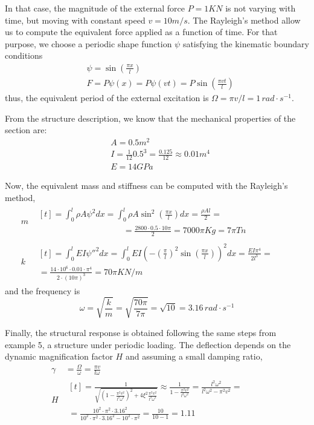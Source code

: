 \begin{Answer}[ref={moving_load}]
In that case, the magnitude of the external force $P=1KN$ is not varying with time, but moving with constant speed $v=10m/s$. The Rayleigh's method allow us to compute the equivalent force applied as a function of time. For that purpose, we choose a periodic shape function $\psi$ satisfying the kinematic boundary conditions
\begin{align*}
&\psi = \sin\left(\frac{\pi x}{l}\right) \\
&F = P\psi(x) = P\psi(vt) = P\sin\left(\frac{\pi vt}{l}\right)
\end{align*}
thus, the equivalent period of the external excitation is $\Omega = \pi v/l = 1\,rad\cdot s^{-1}$.

From the structure description, we know that the mechanical properties of the section are:
\begin{align*}
&A = 0.5m^2 \\
&I = \frac{1}{12}0.5^3 = \frac{0.125}{12} \approx 0.01 m^4\\
&E = 14GPa
\end{align*}

Now, the equivalent mass and stiffness can be computed with the Rayleigh's method,
\begin{align*}
m& \begin{multlined}[t]= \int_0^l \rho A\psi^2dx = \int_0^l \rho A\sin^2\left(\frac{\pi x}{l}\right)dx = \frac{\rho Al}{2} = \\
\phantom{\hspace{10em}}= \frac{2800 \cdot 0.5 \cdot 10\pi}{2} = 7000\pi Kg = 7\pi Tn\end{multlined} \\
k& \begin{multlined}[t]= \int_0^l EI\psi''^2dx = \int_0^l EI\left(-\left(\frac{\pi}{l}\right)^2\sin\left(\frac{\pi x}{l}\right)\right)^2dx = \frac{EI\pi^4}{2l^3} = \qquad \\
= \frac{14\cdot 10^6 \cdot 0.01 \cdot \pi^4}{2 \cdot (10\pi)^3} =
70\pi KN/m \end{multlined}
\end{align*}
and the frequency is
$$
\omega = \sqrt{\frac{k}{m}} = \sqrt{\frac{70\pi}{7\pi}} = \sqrt{10} = 3.16\,rad\cdot s^{-1}
$$

Finally, the structural response is obtained following the same steps from example 5, a structure under periodic loading. The deflection depends on the dynamic magnification factor $H$ and assuming a small damping ratio,
\begin{align*}
\gamma& = \frac{\Omega}{\omega} = \frac{\pi v}{l\omega} \\
H& \begin{multlined}[t]= \frac{1}{\sqrt{\left(1-\frac{\pi^2v^2}{l^2\omega^2}\right)^2 + 4\xi^2\frac{\pi^2v^2}{l^2\omega^2}}} \approx \frac{1}{1-\frac{\pi^2v^2}{l^2\omega^2}} = \frac{l^2\omega^2}{l^2\omega^2-\pi^2v^2} = \qquad \\
= \frac{10^2\cdot\pi^2\cdot 3.16^2}{10^2\cdot\pi^2\cdot 3.16^2 - 10^2\cdot\pi^2}
= \frac{10}{10-1} = 1.11 \end{multlined}
\end{align*}


\end{Answer}
